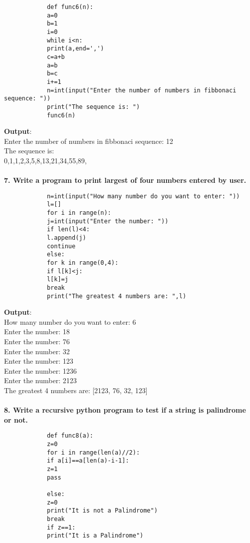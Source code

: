 \documentclass[
a4paper]{article}
\begin{document}
\begin{large}
		\begin{verbatim}
			def func6(n):
			a=0
			b=1
			i=0
			while i<n:
			print(a,end=',')
			c=a+b
			a=b
			b=c
			i+=1
			n=int(input("Enter the number of numbers in fibbonaci sequence: "))
			print("The sequence is: ")
			func6(n)
		\end{verbatim}
		\textbf{Output}:\\
		Enter the number of numbers in fibbonaci sequence: 12\\
		The sequence is: \\
		0,1,1,2,3,5,8,13,21,34,55,89,\\
		\\\textbf{7. Write a program to print largest of four numbers entered by user.}
		\begin{verbatim}
			n=int(input("How many number do you want to enter: "))
			l=[]
			for i in range(n):
			j=int(input("Enter the number: "))
			if len(l)<4:
			l.append(j)
			continue
			else:
			for k in range(0,4):
			if l[k]<j:
			l[k]=j
			break
			print("The greatest 4 numbers are: ",l)
		\end{verbatim}
		\textbf{Output}:\\
		How many number do you want to enter: 6\\
		Enter the number: 18\\
		Enter the number: 76\\
		Enter the number: 32\\
		Enter the number: 123\\
		Enter the number: 1236\\
		Enter the number: 2123\\
		The greatest 4 numbers are:  [2123, 76, 32, 123]\\
		\\\textbf{8. Write a recursive python program to test if a string is palindrome or not.}
		\begin{verbatim}
			def func8(a):
			z=0
			for i in range(len(a)//2):
			if a[i]==a[len(a)-i-1]:
			z=1
			pass
			
			else:
			z=0
			print("It is not a Palindrome")
			break
			if z==1:
			print("It is a Palindrome")
			

\end{verbatim}
\end{large}
\end{document}
